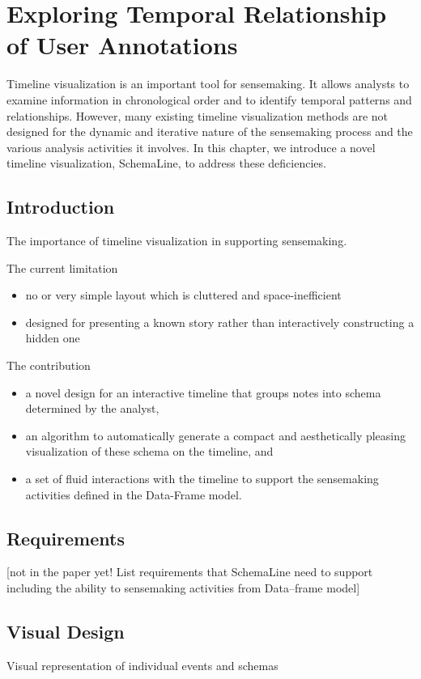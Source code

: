 \chapter{Exploring Temporal Relationship of User Annotations}

\graphicspath{{Chapter3/figures/}}

Timeline visualization is an important tool for sensemaking. It allows analysts to examine information in chronological order and to identify temporal patterns and relationships. However, many existing timeline visualization methods are not designed for the dynamic and iterative nature of the sensemaking process and the various analysis activities it involves. In this chapter, we introduce a novel timeline visualization, SchemaLine, to address these deficiencies.

\section{Introduction}
The importance of timeline visualization in supporting sensemaking.

The current limitation
\begin{itemize}
	\item no or very simple layout which is cluttered and space-inefficient
	\item designed for presenting a known story rather than interactively constructing a hidden one
\end{itemize}  

The contribution
\begin{itemize}
	\item a novel  design for an interactive timeline that groups notes into schema determined by the analyst,
	\item an algorithm to automatically generate a compact and aesthetically pleasing visualization of these schema on the timeline, and
	\item a set of fluid interactions with the timeline to support the sensemaking activities defined in the Data-Frame model.
\end{itemize}

\section{Requirements}
[not in the paper yet! List requirements that SchemaLine need to support including the ability to sensemaking activities from Data--frame model]

\section{Visual Design}
Visual representation of individual events and schemas


